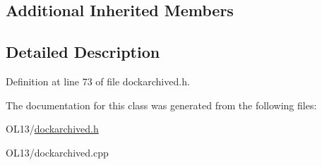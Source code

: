 \subsection*{Additional Inherited Members}


\subsection{Detailed Description}


Definition at line 73 of file dockarchived.\+h.



The documentation for this class was generated from the following files\+:\begin{DoxyCompactItemize}
\item 
O\+L13/\hyperlink{dockarchived_8h}{dockarchived.\+h}\item 
O\+L13/dockarchived.\+cpp\end{DoxyCompactItemize}
